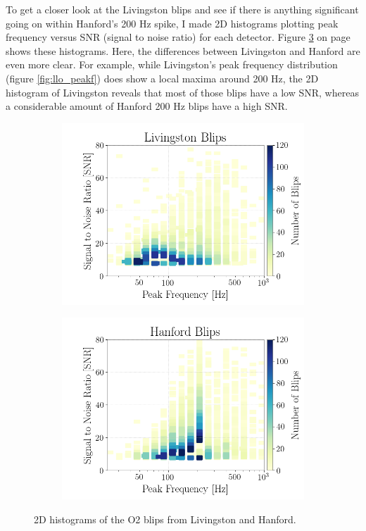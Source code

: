 \documentclass[a4paper]{article}
\begin{document}
To get a closer look at the Livingston blips and see if there is anything significant going on within Hanford's 200 Hz spike, I made 2D histograms plotting peak frequency versus SNR (signal to noise ratio) for each detector. Figure \ref{fig:hists_2d}  on page \pageref{fig:hists_2d} shows these histograms. Here, the differences between Livingston and Hanford are even more clear. For example, while Livingston's peak frequency distribution (figure \ref{fig:llo_peakf}) does show a local maxima around 200 Hz, the 2D histogram of Livingston reveals that most of those blips have a low SNR, whereas a considerable amount of Hanford 200 Hz blips have a high SNR. 

\begin{figure}[h!]
	\centering
	\begin{subfigure}{.49\textwidth}
		\centering
		\includegraphics[width=1\linewidth]{llo_2d}
		\label{fig:llo_2d}
	\end{subfigure}
	\begin{subfigure}{.49\textwidth}
		\centering
		\includegraphics[width=1\linewidth]{lho_2d}
		\label{fig:lho_2d}
	\end{subfigure}
	\caption{2D histograms of the O2 blips from Livingston and Hanford.}
	\label{fig:hists_2d}
\end{figure}
\end{document}
